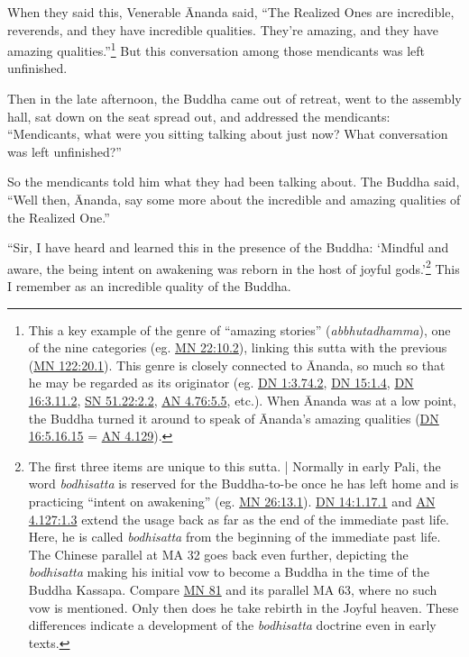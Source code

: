 \documentclass[12pt,openany]{book}%
\begin{document}
When they said this, Venerable Ānanda said, “The Realized Ones are incredible, reverends, and they have incredible qualities. They’re amazing, and they have amazing qualities.”\footnote{This a key example of the genre of “amazing stories” (\textit{abbhutadhamma}), one of the nine categories (eg. \href{https://suttacentral.net/mn22/en/sujato\#10.2}{MN 22:10.2}), linking this sutta with the previous (\href{https://suttacentral.net/mn122/en/sujato\#20.1}{MN 122:20.1}). This genre is closely connected to Ānanda, so much so that he may be regarded as its originator (eg. \href{https://suttacentral.net/dn1/en/sujato\#3.74.2}{DN 1:3.74.2}, \href{https://suttacentral.net/dn15/en/sujato\#1.4}{DN 15:1.4}, \href{https://suttacentral.net/dn16/en/sujato\#3.11.2}{DN 16:3.11.2}, \href{https://suttacentral.net/sn51.22/en/sujato\#2.2}{SN 51.22:2.2}, \href{https://suttacentral.net/an4.76/en/sujato\#5.5}{AN 4.76:5.5}, etc.). When Ānanda was at a low point, the Buddha turned it around to speak of Ānanda’s amazing qualities (\href{https://suttacentral.net/dn16/en/sujato\#5.16.15}{DN 16:5.16.15} = \href{https://suttacentral.net/an4.129/en/sujato}{AN 4.129}). } But this conversation among those mendicants was left unfinished. 

Then in the late afternoon, the Buddha came out of retreat, went to the assembly hall, sat down on the seat spread out, and addressed the mendicants: “Mendicants, what were you sitting talking about just now? What conversation was left unfinished?” 

So the mendicants told him what they had been talking about. The Buddha said, “Well then, Ānanda, say some more about the incredible and amazing qualities of the Realized One.” 

“Sir, I have heard and learned this in the presence of the Buddha: ‘Mindful and aware, the being intent on awakening was reborn in the host of joyful gods.’\footnote{The first three items are unique to this sutta. | Normally in early Pali, the word \textit{bodhisatta} is reserved for the Buddha-to-be once he has left home and is practicing “intent on awakening” (eg. \href{https://suttacentral.net/mn26/en/sujato\#13.1}{MN 26:13.1}). \href{https://suttacentral.net/dn14/en/sujato\#1.17.1}{DN 14:1.17.1} and \href{https://suttacentral.net/an4.127/en/sujato\#1.3}{AN 4.127:1.3} extend the usage back as far as the end of the immediate past life. Here, he is called \textit{bodhisatta} from the beginning of the immediate past life. The Chinese parallel at MA 32 goes back even further, depicting the \textit{bodhisatta} making his initial vow to become a Buddha in the time of the Buddha Kassapa. Compare \href{https://suttacentral.net/mn81/en/sujato}{MN 81} and its parallel MA 63, where no such vow is mentioned. Only then does he take rebirth in the Joyful heaven. These differences indicate a development of the \textit{bodhisatta} doctrine even in early texts. } This I remember as an incredible quality of the Buddha. 
\end{document}
